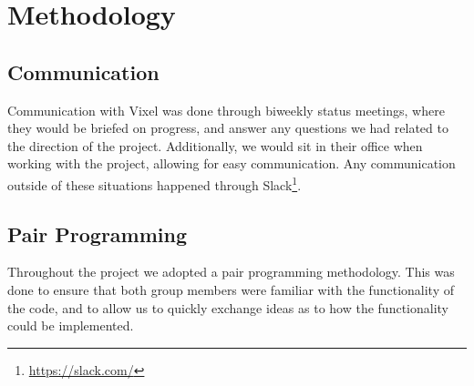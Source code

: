 \section{Methodology}
\subsection{Communication}
Communication with Vixel was done through biweekly status meetings, where they would be briefed on progress, and answer any questions we had related to the direction of the project. Additionally, we would sit in their office when working with the project, allowing for easy communication. Any communication outside of these situations happened through Slack\footnote{\url{https://slack.com/}}.

\subsection{Pair Programming}
Throughout the project we adopted a pair programming methodology. This was done to ensure that both group members were familiar with the functionality of the code, and to allow us to quickly exchange ideas as to how the functionality could be implemented.

